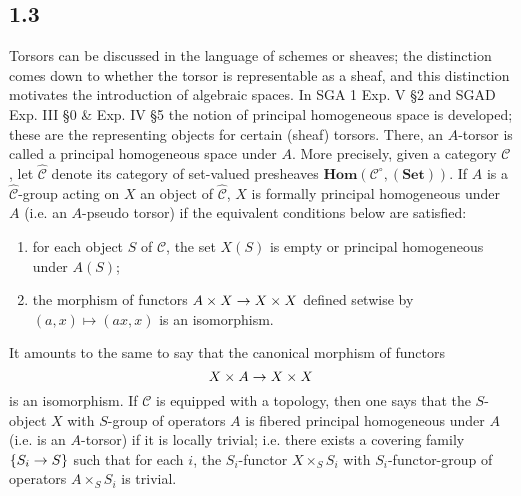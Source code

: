 \documentclass[deligne.tex]{subfiles}
\begin{document}
\subsection*{1.3}
Torsors can be discussed in the language of schemes or sheaves; the
distinction comes down to whether the torsor is representable as a sheaf,
and this distinction motivates the introduction of algebraic spaces.
In SGA 1 Exp. V \S2 and SGAD Exp. III \S0 \& Exp. IV \S5
the notion of principal homogeneous space is developed;
these are the representing objects for certain (sheaf) torsors.
There, an $A$-torsor is called a principal homogeneous space under $A$.
More precisely, given a category $\mathscr C$, let
$\widehat{\mathscr C}$ denote its category of set-valued presheaves
$\textbf{Hom}(\mathscr C^\circ,(\textbf{Set}))$.
If $A$ is a $\widehat{\mathscr C}$-group acting on $X$ an object of
$\widehat{\mathscr C}$, $X$ is formally principal homogeneous under $A$
(i.e. an $A$-pseudo torsor) if the equivalent conditions below are satisfied:
\begin{enumerate}[label=(\roman*)]
	\item for each object $S$ of $\mathscr C$, the set $X(S)$ is empty or principal homogeneous under $A(S)$;
	\item the morphism of functors $A\times X\rightarrow X\times X$ defined setwise by $(a,x)\mapsto(ax,x)$ is an isomorphism.
\end{enumerate}
It amounts to the same to say that the canonical morphism of functors
\begin{equation*} X\times A\rightarrow X\times X \end{equation*} is an isomorphism.
If $\mathscr C$ is equipped with a topology, then one says that the
$S$-object $X$ with $S$-group of operators $A$ is fibered principal
homogeneous under $A$ (i.e. is an $A$-torsor) if it is locally trivial; i.e.
there exists a covering family $\{S_i\rightarrow S\}$ such that for each $i$, the
$S_i$-functor $X\times_S S_i$ with $S_i$-functor-group of operators
$A\times_S S_i$ is trivial.
\end{document}
